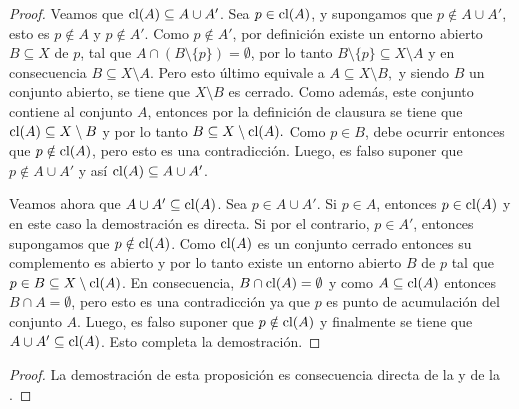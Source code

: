 
\begin{proof}
Veamos que $\mathop{\hbox{\rm cl}}\nolimits(A)\subseteq A\cup A'$. Sea $p\in\mathop{\hbox{\rm cl}}\nolimits(A)$, y supongamos
que $p\notin A\cup A'$, esto es $p\notin A$ y $p\notin A'$.
Como $p\notin A'$, por definición existe un entorno abierto $B\subseteq X$
de $p$, tal que $A\cap(B\setminus\{p\})=\emptyset$, por lo tanto 
$B\setminus\{p\}\subseteq X\setminus A$ y en consecuencia $B\subseteq X\setminus A$.
Pero esto último equivale a $A\subseteq X\setminus B,$ y siendo $B$
un conjunto abierto, se tiene que $X\setminus B$ es cerrado. Como además,
este conjunto contiene al conjunto $A$, entonces por la definición de clausura
se tiene que $\mathop{\hbox{\rm cl}}\nolimits(A)\subseteq X\setminus B$ y por lo tanto
$B\subseteq X\setminus \mathop{\hbox{\rm cl}}\nolimits(A).$ Como $p\in B$, debe ocurrir entonces
que $p\notin\mathop{\hbox{\rm cl}}\nolimits(A)$, pero esto es una contradicción. Luego, es falso 
suponer que $p\notin A\cup A'$ y así $\mathop{\hbox{\rm cl}}\nolimits(A)\subseteq A\cup A'$.

Veamos ahora que $A\cup A'\subseteq\mathop{\hbox{\rm cl}}\nolimits(A)$. Sea $p\in A\cup A'$. 
Si $p\in A$, entonces $p\in\mathop{\hbox{\rm cl}}\nolimits(A)$ y en este caso la demostración es 
directa. Si por el contrario, $p\in A'$, entonces supongamos que 
$p\notin\mathop{\hbox{\rm cl}}\nolimits(A)$. Como $\mathop{\hbox{\rm cl}}\nolimits(A)$ es un conjunto cerrado entonces su 
complemento es abierto y por lo tanto existe un entorno abierto $B$
de $p$ tal que $p\in B\subseteq X\setminus\mathop{\hbox{\rm cl}}\nolimits(A)$. En consecuencia,
$B\cap\mathop{\hbox{\rm cl}}\nolimits(A)=\emptyset$ y como $A\subseteq\mathop{\hbox{\rm cl}}\nolimits(A)$ entonces 
$B\cap A=\emptyset$, pero esto es una contradicción ya que $p$ es punto de
acumulación del conjunto $A$. Luego, es falso suponer que $p\notin\mathop{\hbox{\rm cl}}\nolimits(A)$
y finalmente se tiene que $A\cup A'\subseteq\mathop{\hbox{\rm cl}}\nolimits(A)$. Esto completa la demostración.
\end{proof}

\begin{proof}
La demostración de esta proposición es consecuencia directa
de la  y de la .
\end{proof}
